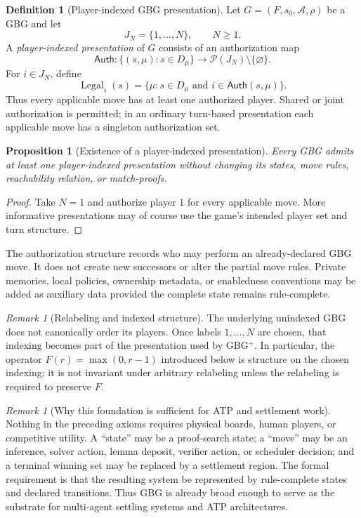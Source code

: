 \documentclass[11pt]{article}
\newtheorem{proposition}[theorem]{Proposition}
\theoremstyle{definition}
\newtheorem{definition}[theorem]{Definition}
\theoremstyle{remark}
\newtheorem{remark}[theorem]{Remark}
\newcommand{\Legal}{\operatorname{Legal}}
\begin{document}
\begin{definition}[Player-indexed GBG presentation]
Let $G=(F,s_0,\mathcal A,\rho)$ be a GBG and let
\[
J_N=\{1,\ldots,N\},\qquad N\ge1.
\]
A \emph{player-indexed presentation} of $G$ consists of an authorization map
\[
\mathsf{Auth}:\{(s,\mu):s\in D_\mu\}
\longrightarrow \mathcal P(J_N)\setminus\{\varnothing\}.
\]
For $i\in J_N$, define
\[
\Legal_i(s)=\{\mu:s\in D_\mu\text{ and }i\in\mathsf{Auth}(s,\mu)\}.
\]
Thus every applicable move has at least one authorized player.  Shared or joint authorization is permitted; in an ordinary turn-based presentation each applicable move has a singleton authorization set.
\end{definition}

\begin{proposition}[Existence of a player-indexed presentation]
Every GBG admits at least one player-indexed presentation without changing its states, move rules, reachability relation, or match-proofs.
\end{proposition}

\begin{proof}
Take $N=1$ and authorize player $1$ for every applicable move.  More informative presentations may of course use the game's intended player set and turn structure.
\end{proof}

The authorization structure records who may perform an already-declared GBG move.  It does not create new successors or alter the partial move rules.  Private memories, local policies, ownership metadata, or enabledness conventions may be added as auxiliary data provided the complete state remains rule-complete.

\begin{remark}[Relabeling and indexed structure]
The underlying unindexed GBG does not canonically order its players.  Once labels $1,\ldots,N$ are chosen, that indexing becomes part of the presentation used by GBG$^{+}$.  In particular, the operator $F(r)=\max(0,r-1)$ introduced below is structure on the chosen indexing; it is not invariant under arbitrary relabeling unless the relabeling is required to preserve $F$.
\end{remark}

\begin{remark}[Why this foundation is sufficient for ATP and settlement work]
Nothing in the preceding axioms requires physical boards, human players, or competitive utility.  A ``state'' may be a proof-search state; a ``move'' may be an inference, solver action, lemma deposit, verifier action, or scheduler decision; and a terminal winning set may be replaced by a settlement region.  The formal requirement is that the resulting system be represented by rule-complete states and declared transitions.  Thus GBG is already broad enough to serve as the substrate for multi-agent settling systems and ATP architectures.
\end{remark}
\end{document}
